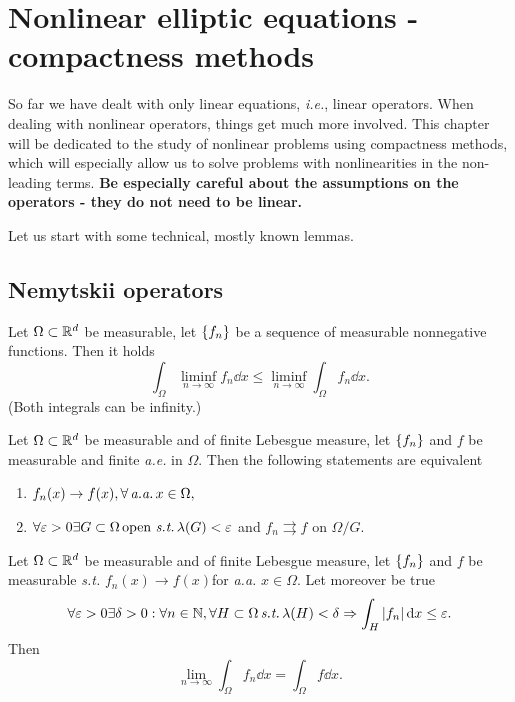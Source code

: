 \documentclass{article}
\begin{document}
\section{Nonlinear elliptic equations - compactness methods}
\label{sec:nonlinear_elliptic_compact}

So far we have dealt with only linear equations, \textit{i.e.}, linear operators. When dealing with nonlinear operators, things get much more involved. This chapter will be dedicated to the study of nonlinear problems using compactness methods, which will especially allow us to solve problems with nonlinearities in the non-leading terms. \textbf{Be especially careful about the assumptions on the operators - they do not need to be linear.}

Let us start with some technical, mostly known lemmas.

\subsection{Nemytskii operators}
\label{sec:nemytskii_operators}

\begin{lemma}[Fatou]
	Let $\Omega \subset {\mathbb R}^{d}$ be measurable, let $\qty{f_n}$ be a sequence of measurable nonnegative functions. Then it holds
	\[
		\int_{\Omega}\liminf_{n\to \infty}f_n\dd{x} \leq \liminf_{n \to \infty}\int_{\Omega}f_n\dd{x}.
	\]
	(Both integrals can be infinity.)
    
\end{lemma}

\begin{theorem}[Iegorov]
	Let $\Omega \subset {\mathbb R}^{d}$ be measurable and of finite Lebesgue measure, let $\qty{f_n}$ and $f$ be measurable and finite \textit{a.e.} in $\Omega$. Then the following statements are equivalent
\begin{enumerate}
	\item $f_n(x) \to f(x), \forall \, \text{\textit{a.a.}} \,x \in \Omega,$
	\item $\forall \varepsilon >0 \exists G \subset \Omega \, \text{open} \, \, \text{\textit{s.t.}} \, \lambda(G) < \varepsilon$ and $f_n \rightrightarrows f$ on $\Omega / G.$
\end{enumerate}
\end{theorem}

\begin{theorem}[Vitali]
    Let $\Omega \subset {\mathbb R}^{d}$ be measurable and of finite Lebesgue measure, let $\qty{f_n}$ and $f$ be measurable \textit{s.t.} $f_n(x) \to f(x)$for \textit{a.a.} $x \in \Omega$. Let moreover be true
    \[
	    \forall \varepsilon > 0 \exists \delta >0: \forall n \in {\mathbb N}, \forall H \subset \Omega \, \text{\textit{s.t.}} \, \lambda(H) < \delta \Rightarrow \int_{H}|f_n|\dd{x} \leq \varepsilon.
    \]
    Then
    \[
	    \lim_{n\to \infty} \int_{\Omega}f_n\dd{x} = \int_{\Omega}f\dd{x}.
    \]
\end{theorem}
\end{document}
